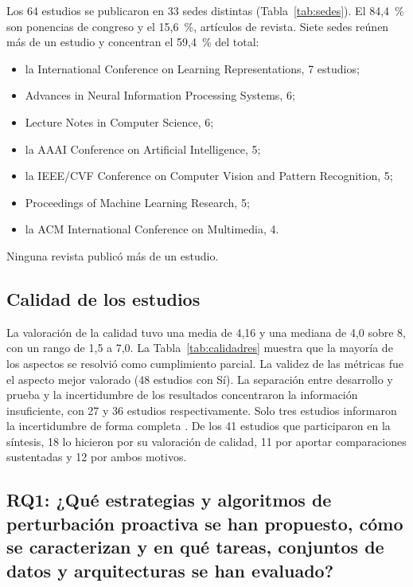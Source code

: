 Los 64 estudios se publicaron en 33 sedes distintas (Tabla~\ref{tab:sedes}). El 84,4~\% son ponencias de congreso y el 15,6~\%, artículos de revista. Siete sedes reúnen más de un estudio y concentran el 59,4~\% del total:
\begin{itemize}
\item la International Conference on Learning Representations, 7 estudios;
\item Advances in Neural Information Processing Systems, 6;
\item Lecture Notes in Computer Science, 6;
\item la AAAI Conference on Artificial Intelligence, 5;
\item la IEEE/CVF Conference on Computer Vision and Pattern Recognition, 5;
\item Proceedings of Machine Learning Research, 5;
\item la ACM International Conference on Multimedia, 4.
\end{itemize}
Ninguna revista publicó más de un estudio.



\subsection{Calidad de los estudios}

La valoración de la calidad tuvo una media de 4,16 y una mediana de 4,0 sobre 8, con un rango de 1,5 a 7,0. La Tabla~\ref{tab:calidadres} muestra que la mayoría de los aspectos se resolvió como cumplimiento parcial. La validez de las métricas fue el aspecto mejor valorado (48 estudios con Sí). La separación entre desarrollo y prueba y la incertidumbre de los resultados concentraron la información insuficiente, con 27 y 36 estudios respectivamente. Solo tres estudios informaron la incertidumbre de forma completa \cite{S0123,S0148,S0150}. De los 41 estudios que participaron en la síntesis, 18 lo hicieron por su valoración de calidad, 11 por aportar comparaciones sustentadas y 12 por ambos motivos.



\subsection{RQ1: ¿Qué estrategias y algoritmos de perturbación proactiva se han propuesto, cómo se caracterizan y en qué tareas, conjuntos de datos y arquitecturas se han evaluado?}\label{sec:rq1}

